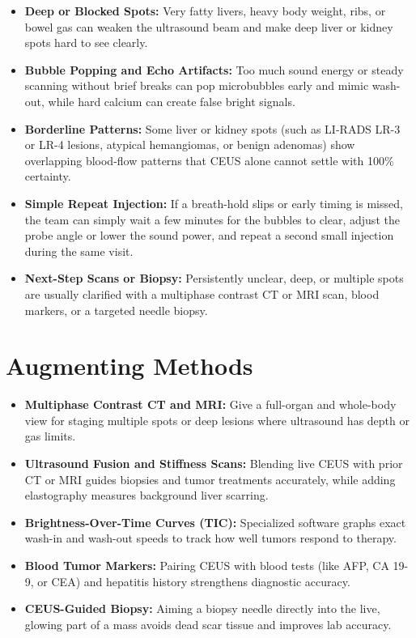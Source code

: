 \begin{itemize}
    \item \textbf{Deep or Blocked Spots:} Very fatty livers, heavy body weight, ribs, or bowel gas can weaken the ultrasound beam and make deep liver or kidney spots hard to see clearly.
    \item \textbf{Bubble Popping and Echo Artifacts:} Too much sound energy or steady scanning without brief breaks can pop microbubbles early and mimic wash-out, while hard calcium can create false bright signals.
    \item \textbf{Borderline Patterns:} Some liver or kidney spots (such as LI-RADS LR-3 or LR-4 lesions, atypical hemangiomas, or benign adenomas) show overlapping blood-flow patterns that CEUS alone cannot settle with 100\% certainty.
    \item \textbf{Simple Repeat Injection:} If a breath-hold slips or early timing is missed, the team can simply wait a few minutes for the bubbles to clear, adjust the probe angle or lower the sound power, and repeat a second small injection during the same visit.
    \item \textbf{Next-Step Scans or Biopsy:} Persistently unclear, deep, or multiple spots are usually clarified with a multiphase contrast CT or MRI scan, blood markers, or a targeted needle biopsy.
\end{itemize}

\section{Augmenting Methods}

\begin{itemize}
    \item \textbf{Multiphase Contrast CT and MRI:} Give a full-organ and whole-body view for staging multiple spots or deep lesions where ultrasound has depth or gas limits.
    \item \textbf{Ultrasound Fusion and Stiffness Scans:} Blending live CEUS with prior CT or MRI guides biopsies and tumor treatments accurately, while adding elastography measures background liver scarring.
    \item \textbf{Brightness-Over-Time Curves (TIC):} Specialized software graphs exact wash-in and wash-out speeds to track how well tumors respond to therapy.
    \item \textbf{Blood Tumor Markers:} Pairing CEUS with blood tests (like AFP, CA 19-9, or CEA) and hepatitis history strengthens diagnostic accuracy.
    \item \textbf{CEUS-Guided Biopsy:} Aiming a biopsy needle directly into the live, glowing part of a mass avoids dead scar tissue and improves lab accuracy.
\end{itemize}

